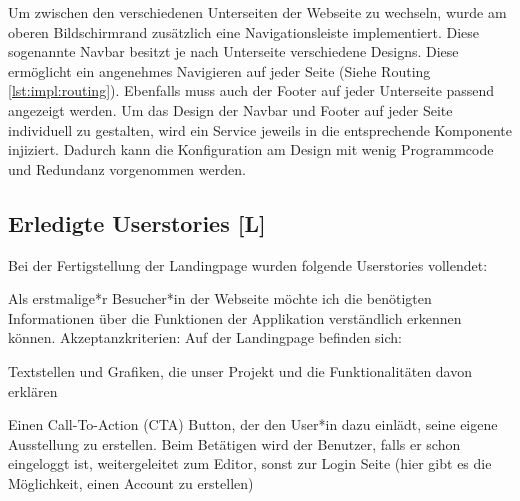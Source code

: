 Um zwischen den verschiedenen Unterseiten der Webseite zu wechseln, wurde am oberen Bildschirmrand zusätzlich eine Navigationsleiste implementiert. Diese sogenannte Navbar besitzt je nach Unterseite verschiedene Designs. Diese ermöglicht ein angenehmes Navigieren auf jeder Seite (Siehe Routing \ref{lst:impl:routing}). Ebenfalls muss auch der Footer auf jeder Unterseite passend angezeigt werden. Um das Design der Navbar und Footer auf jeder Seite individuell zu gestalten, wird ein Service jeweils in die entsprechende Komponente injiziert. Dadurch kann die Konfiguration am Design mit wenig Programmcode und Redundanz vorgenommen werden.

\subsection{Erledigte Userstories [L]}
\label{Finished Landingpage}
Bei der Fertigstellung der Landingpage wurden folgende Userstories vollendet: 
\begin{compactitem}
    \item Als erstmalige*r Besucher*in der Webseite möchte ich die benötigten Informationen über die Funktionen der Applikation verständlich erkennen können. Akzeptanzkriterien:
    Auf der Landingpage befinden sich:
    \begin{compactitem}
        \item Textstellen und Grafiken, die unser Projekt und die Funktionalitäten davon erklären
        \item Einen Call-To-Action (CTA) Button, der den User*in dazu einlädt, seine eigene Ausstellung zu erstellen. Beim Betätigen wird der Benutzer, falls er schon eingeloggt ist, weitergeleitet zum Editor, sonst zur Login Seite (hier gibt es die Möglichkeit, einen Account zu erstellen)
    \end{compactitem}
\end{compactitem}

